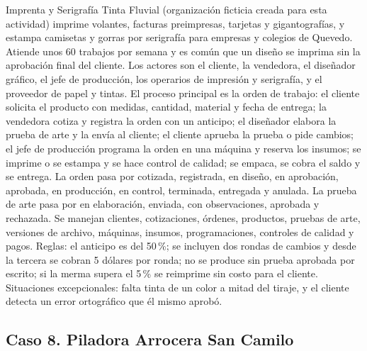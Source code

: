 \documentclass[11pt]{article}
\newcommand{\subseccion}[1]{\subsection{\textcolor{midblue}{#1}}}
\begin{document}
Imprenta y Serigrafía Tinta Fluvial (organización ficticia creada para esta actividad) imprime volantes, facturas preimpresas, tarjetas y gigantografías, y estampa camisetas y gorras por serigrafía para empresas y colegios de Quevedo. Atiende unos 60 trabajos por semana y es común que un diseño se imprima sin la aprobación final del cliente. Los actores son el cliente, la vendedora, el diseñador gráfico, el jefe de producción, los operarios de impresión y serigrafía, y el proveedor de papel y tintas. El proceso principal es la orden de trabajo: el cliente solicita el producto con medidas, cantidad, material y fecha de entrega; la vendedora cotiza y registra la orden con un anticipo; el diseñador elabora la prueba de arte y la envía al cliente; el cliente aprueba la prueba o pide cambios; el jefe de producción programa la orden en una máquina y reserva los insumos; se imprime o se estampa y se hace control de calidad; se empaca, se cobra el saldo y se entrega. La orden pasa por cotizada, registrada, en diseño, en aprobación, aprobada, en producción, en control, terminada, entregada y anulada. La prueba de arte pasa por en elaboración, enviada, con observaciones, aprobada y rechazada. Se manejan clientes, cotizaciones, órdenes, productos, pruebas de arte, versiones de archivo, máquinas, insumos, programaciones, controles de calidad y pagos. Reglas: el anticipo es del 50\,\%; se incluyen dos rondas de cambios y desde la tercera se cobran 5 dólares por ronda; no se produce sin prueba aprobada por escrito; si la merma supera el 5\,\% se reimprime sin costo para el cliente. Situaciones excepcionales: falta tinta de un color a mitad del tiraje, y el cliente detecta un error ortográfico que él mismo aprobó.

\subseccion{Caso 8. Piladora Arrocera San Camilo}
\end{document}
